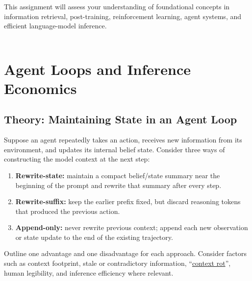 


\usepackage{macros}
\usepackage{float}
\usepackage{booktabs}

\author{
\Large
First (and Last) Homework
}



\maketitle

This assignment will assess your understanding of foundational concepts in information retrieval, post-training, reinforcement learning, agent systems, and efficient language-model inference. \\
\\

\additionalNotesTeamUpThree


\section{Agent Loops and Inference Economics}

\subsection{Theory: Maintaining State in an Agent Loop}
Suppose an agent repeatedly takes an action, receives new information from its environment, and updates its internal belief state.
Consider three ways of constructing the model context at the next step:

\begin{enumerate}[label=(\alph*), itemsep=0.5ex]
    \item \textbf{Rewrite-state:} maintain a compact belief/state summary near the beginning of the prompt and rewrite that summary after every step.
    \item \textbf{Rewrite-suffix:} keep the earlier prefix fixed, but discard reasoning tokens that produced the previous action.
    \item \textbf{Append-only:} never rewrite previous context; append each new observation or state update to the end of the existing trajectory.
\end{enumerate}

Outline one advantage and one disadvantage for each approach. Consider factors such as context footprint, stale or contradictory information, ``\href{https://www.trychroma.com/research/context-rot}{context rot}'', human legibility, and inference efficiency where relevant.


